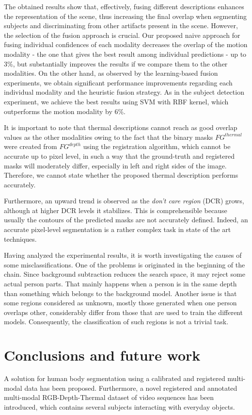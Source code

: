 \documentclass[10pt,twocolumn,letterpaper]{article}
\begin{document}
The obtained results show that, effectively, fusing different descriptions enhances the representation of the scene, thus increasing the final overlap when segmenting subjects and discriminating from other artifacts present in the scene. However, the selection of the fusion approach is crucial. Our proposed naive approach for fusing individual confidences of each modality decreases the overlap of the motion modality - the one that gives the best result among individual predictions - up to 3\%, but substantially improves the results if we compare them to the other modalities. On the other hand, as observed by the learning-based fusion experiments, we obtain significant performance improvements regarding each individual modality and the heuristic fusion strategy. As in the subject detection experiment, we achieve the best results using SVM with RBF kernel, which outperforms the motion modality by 6\%.

It is important to note that thermal descriptions cannot reach as good overlap values as the other modalities owing to the fact that the binary masks $FG^{thermal}$ were created from $FG^{depth}$ using the registration algorithm, which cannot be accurate up to pixel level, in such a way that the ground-truth and registered masks will moderately differ, especially in left and right sides of the image. Therefore, we cannot state whether the proposed thermal description performs accurately.

Furthermore, an upward trend is observed as the \emph{don't care region} (DCR) grows, although at higher DCR levels it stabilizes. This is comprehensible because usually the contours of the predicted masks are not accurately defined. Indeed, an accurate pixel-level segmentation is a rather complex task in state of the art techniques.

Having analyzed the experimental results, it is worth investigating the causes of some
misclassifications. One of the problems is originated in the beginning of the chain. Since
background subtraction reduces the search space, it may reject some actual person parts.
That mainly happens when a person is in the same depth than something which belongs
to the background model. Another issue is that some regions considered as unknown,
mostly those generated when one person overlaps other, considerably differ from those
that are used to train the different models. Consequently, the classification of such regions
is not a trivial task.

\section{Conclusions and future work}
\label{sec:conclusions}
A solution for human body segmentation using a calibrated and registered multi-modal data has been proposed. Furthermore, a novel registered and annotated multi-modal RGB-Depth-Thermal dataset of video sequences has been introduced, which contains several
subjects interacting with everyday objects.
\end{document}
